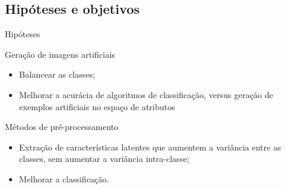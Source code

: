 \documentclass{beamer}
\begin{document}
\subsection{Hipóteses e objetivos}
\begin{frame}{Hipóteses}
  \begin{block}{Geração de imagens artificiais}
    \justifying
    \begin{itemize}
      \item Balancear as classes;
      \item Melhorar a acurácia de algoritmos de classificação, versus geração de exemplos artificiais no espaço de atributos
    \end{itemize}
  \end{block}
  \begin{block}{Métodos de pré-processamento}
    \justifying
    \begin{itemize}
      \item Extração de características latentes que aumentem a variância entre as classes, sem aumentar a variância intra-classe;
      \item Melhorar a classificação.
    \end{itemize}
  \end{block}
\end{frame}
\end{document}

